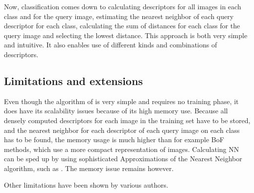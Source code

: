 \documentclass[a4paper,10pt]{article}
\begin{document}
Now, classification comes down to calculating descriptors for all images in each class and for the query image, estimating the nearest neighbor of each query descriptor for each class, calculating the sum of distances for each class for the query image and selecting the lowest distance. This approach is both very simple and intuitive. It also enables use of different kinds and combinations of descriptors.



\subsection{Limitations and extensions} %
\label{sub:limitations_and_extensions}

Even though the algorithm of \cite{boiman2008defense} is very simple and requires no training phase, it does have its scalability issues because of its high memory use. Because all densely computed descriptors for each image in the training set have to be stored, and the nearest neighbor for each descriptor of each query image on each class has to be found, the memory usage is much higher than for example BoF methods, which use a more compact representation of images. Calculating NN can be sped up by using sophisticated Approximations of the Nearest Neighbor algorithm, such as . The memory issue remains however.

Other limitations have been shown by various authors.\cite{behmo2010towards, wang2011improved,mccann2011local,tuytelaars2011nbnn,timofte2012iterative}
\end{document}
